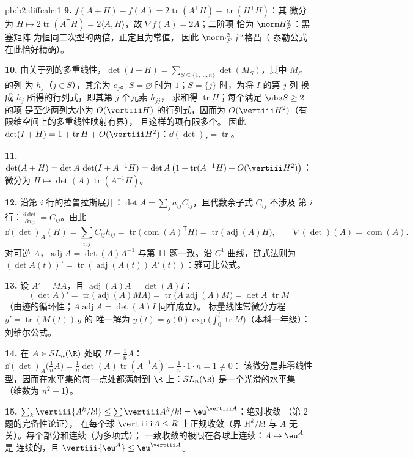 \begin{solution}{pb:b2:diffcalc:1}
\textbf{9.} $f(A + H) - f(A) = 2\operatorname{tr}
(A^{\mathsf T}H) + \operatorname{tr}(H^{\mathsf T}H)$：其
微分为 $H \mapsto 2\operatorname{tr}(A^{\mathsf T}H) =
2\langle A, H\rangle$，故 $\nabla f(A) = 2A$；二阶项
恰为 $\norm H_F^2$：黑塞矩阵
为恒同二次型的两倍，正定且为常值，
因此 $\norm\cdot_F^2$ 严格凸（
泰勒公式在此恰好精确）。

\textbf{10.} 由关于列的多重线性，$\det(I + H) =
\sum_{S\subseteq\{1,\dots,n\}}\det(M_S)$，其中 $M_S$ 的列
为 $h_j$（$j \in S$），其余为 $e_j$。$S = \varnothing$
时为 $1$；$S = \{j\}$ 时，为将 $I$ 的第 $j$ 列
换成 $h_j$ 所得的行列式，即其第 $j$ 个元素 $h_{jj}$，
求和得 $\operatorname{tr}H$；每个满足 $\abs S \geq 2$ 的项
是至少两列大小为
$O(\vertiii H)$ 的行列式，因而为 $O(\vertiii H^2)$（有限维空间上的多重线性映射有界），
且这样的项有限多个。
因此 $\det(I + H) = 1 + \operatorname{tr}H +
O(\vertiii H^2)$：$\dd(\det)_I = \operatorname{tr}$。

\textbf{11.} $\det(A + H) = \det A\,\det(I + A^{-1}H) =
\det A\,\bigl(1 + \operatorname{tr}(A^{-1}H) +
O(\vertiii H^2)\bigr)$：微分为 $H \mapsto
\det(A)\operatorname{tr}(A^{-1}H)$。

\textbf{12.} 沿第 $i$ 行的拉普拉斯展开：$\det A =
\sum_j a_{ij}C_{ij}$，且代数余子式 $C_{ij}$ 不涉及
第 $i$ 行：$\frac{\partial\det}{\partial a_{ij}} = C_{ij}$。由此
\[
\dd(\det)_A(H) = \sum_{i,j}C_{ij}h_{ij}
= \operatorname{tr}\bigl(\operatorname{com}(A)^{\mathsf T}
H\bigr)
= \operatorname{tr}\bigl(\operatorname{adj}(A)H\bigr),
\qquad
\nabla(\det)(A) = \operatorname{com}(A) .
\]
对可逆 $A$，$\operatorname{adj}A = \det(A)A^{-1}$
与第 11 题一致。沿 $C^1$ 曲线，链式法则为
$(\det A(t))' = \operatorname{tr}(\operatorname{adj}
(A(t))\,A'(t))$：雅可比公式。

\textbf{13.} 设 $A' = MA$，且
$\operatorname{adj}(A)A = \det(A)I$：
\[
(\det A)' = \operatorname{tr}\bigl(\operatorname{adj}(A)MA
\bigr)
= \operatorname{tr}\bigl(A\operatorname{adj}(A)M\bigr)
= \det A\;\operatorname{tr}M
\]
（由迹的循环性；$A\operatorname{adj}A = \det(A) I$ 同样成立）。
标量线性常微分方程 $y' = \operatorname{tr}(M(t))\,y$ 的
唯一解为 $y(t) = y(0)\exp\bigl(\int_0^t
\operatorname{tr}M\bigr)$（本科一年级）：刘维尔公式。

\textbf{14.} 在 $A \in SL_n(\R)$ 处取 $H = \frac1nA$：
$\dd(\det)_A\bigl(\tfrac1nA\bigr) = \frac1n\det(A)
\operatorname{tr}(A^{-1}A) = \frac1n\cdot1\cdot n = 1 \neq 0$：
该微分是非零线性型，因而在水平集的每一点处都满射到
$\R$ 上：$SL_n(\R)$ 是一个光滑的水平集
（维数为 $n^2 - 1$）。

\textbf{15.} $\sum_k\vertiii{A^k/k!} \leq
\sum\vertiii A^k/k! = \eu^{\vertiii A}$：绝对收敛
（第 2 题的完备性论证），
在每个球 $\vertiii A \leq R$ 上正规收敛（界 $R^k/k!$ 与
$A$ 无关）。每个部分和连续（为多项式）；
一致收敛的极限在各球上连续：$A \mapsto \eu^A$ 是
连续的，且 $\vertiii{\eu^A} \leq \eu^{\vertiii A}$。


\end{solution}
